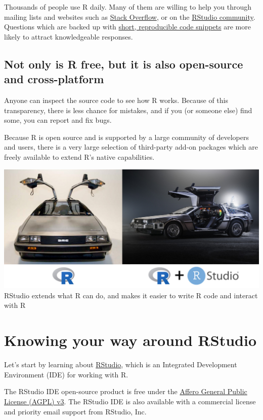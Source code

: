 \documentclass[]{book}
\begin{document}
Thousands of people use R daily. Many of them are willing to help you
through mailing lists and websites such as
\href{https://stackoverflow.com/}{Stack Overflow}, or on the
\href{https://community.rstudio.com/}{RStudio community}. Questions
which are backed up with \href{https://www.tidyverse.org/help/}{short,
reproducible code snippets} are more likely to attract knowledgeable
responses.

\subsection{Not only is R free, but it is also open-source and
cross-platform}\label{not-only-is-r-free-but-it-is-also-open-source-and-cross-platform}

Anyone can inspect the source code to see how R works. Because of this
transparency, there is less chance for mistakes, and if you (or someone
else) find some, you can report and fix bugs.

Because R is open source and is supported by a large community of
developers and users, there is a very large selection of third-party
add-on packages which are freely available to extend R's native
capabilities.

\includegraphics{./fig/r+rstudio-analogy.jpg} RStudio extends what R can
do, and makes it easier to write R code and interact with R

\section{Knowing your way around
RStudio}\label{knowing-your-way-around-rstudio}

Let's start by learning about \href{https://www.rstudio.com/}{RStudio},
which is an Integrated Development Environment (IDE) for working with R.

The RStudio IDE open-source product is free under the
\href{https://www.gnu.org/licenses/agpl-3.0.en.html}{Affero General
Public License (AGPL) v3}. The RStudio IDE is also available with a
commercial license and priority email support from RStudio, Inc.
\end{document}
